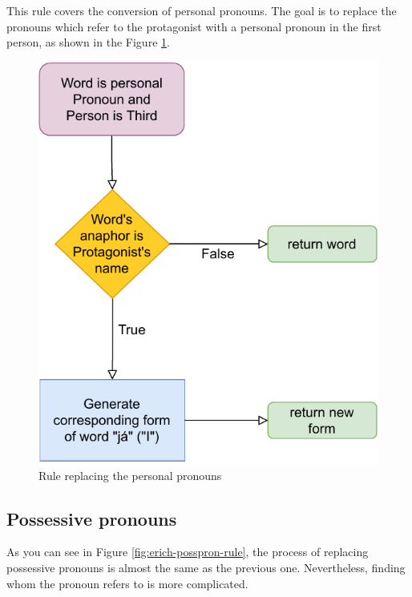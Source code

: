 This rule covers the conversion of personal pronouns. The goal is to replace the pronouns which refer to the protagonist with a personal pronoun in the first person, as shown in the Figure \ref{fig:erich-perspron-rule}.

\begin{figure}[!htbp]
\includegraphics[]{data/Erich-Perspron-Rule.pdf}
\caption{Rule replacing the personal pronouns}
\label{fig:erich-perspron-rule}
\end{figure}

\subsection{Possessive pronouns}

As you can see in Figure \ref{fig:erich-posspron-rule}, the process of replacing possessive pronouns is almost the same as the previous one. Nevertheless, finding whom the pronoun refers to is more complicated.

